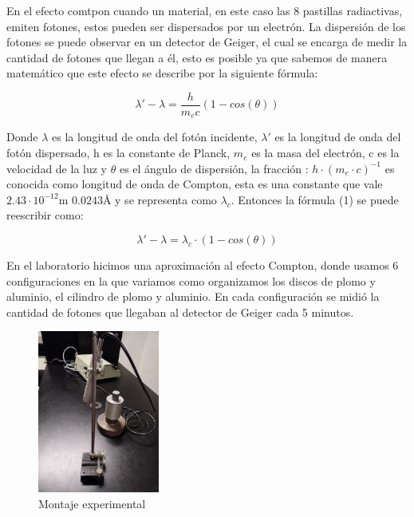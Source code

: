 \documentclass[a4paper]{article}
\begin{document}
    \indent En el efecto comtpon cuando un material, en este caso las 8 pastillas radiactivas, emiten fotones, estos pueden ser dispersados por un electrón. La dispersión de los fotones se puede observar en un detector de Geiger, el cual se encarga de medir la cantidad de fotones que llegan a él, esto es posible ya que sabemos de manera matemático que este efecto se describe por la siguiente fórmula:\\

    \begin{center}
        \begin{equation}
            \lambda' - \lambda = \frac{h}{m_e c} (1 - cos(\theta))
        \end{equation}
    \end{center}

    \indent Donde $\lambda$ es la longitud de onda del fotón incidente, $\lambda'$ es la longitud de onda del fotón dispersado, h es la constante de Planck, $m_e$ es la masa del electrón, c es la velocidad de la luz y $\theta$ es el ángulo de dispersión, la fracción : $h \cdot (m_e \cdot c)^{-1}$ es conocida como longitud de onda de Compton, esta es una constante que vale $2.43 \cdot 10^{-12}$m $0.0243$Å y se representa como $\lambda_c$. Entonces la fórmula (1) se puede reescribir como:\\

    \begin{center}
        \begin{equation}
            \lambda' - \lambda =  \lambda_c \cdot (1 - cos(\theta))
        \end{equation}
    \end{center}

    \indent En el laboratorio hicimos una aproximación al efecto Compton, donde usamos 6 configuraciones en la que variamos como organizamos los discos de plomo y aluminio, el cilindro de plomo y aluminio. En cada configuración se midió la cantidad de fotones que llegaban al detector de Geiger cada 5 minutos.\\

    \begin{figure}[h!]
        \centering
        \includegraphics[width=4cm]{../imagenes/labcomton.jpg}
        \caption{Montaje experimental}
    \end{figure}
    
\end{document}
